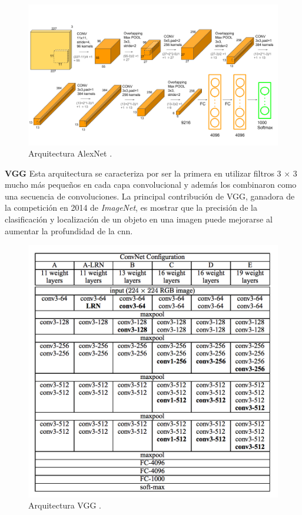 \begin{figure}[H]
 \centering
  \includegraphics[scale=0.4,keepaspectratio=true,clip=true]{imagenes/MarcoTeorico/AlexNet-1.png}
  \caption{Arquitectura AlexNet \citep{alexnet}.}
	\label{Fig:alexnet}
\end{figure}


\par \textbf{VGG} \citep{vgg} Esta arquitectura se caracteriza por ser la primera en utilizar filtros 3 × 3 mucho más pequeños en cada capa convolucional y además los combinaron como una secuencia de convoluciones. La principal contribución de VGG, ganadora de la competición en 2014 de \textit{ImageNet}, es mostrar que la precisión de la clasificación y localización de un objeto en una imagen puede mejorarse al aumentar la profundidad de la \ac{cnn}.

\begin{figure}[H]
 \centering
  \includegraphics[scale=0.6,keepaspectratio=true,clip=true]{imagenes/MarcoTeorico/vgg.png}
  \caption{Arquitectura VGG \citep{vgg}.}
	\label{Fig:vgg}
\end{figure}

